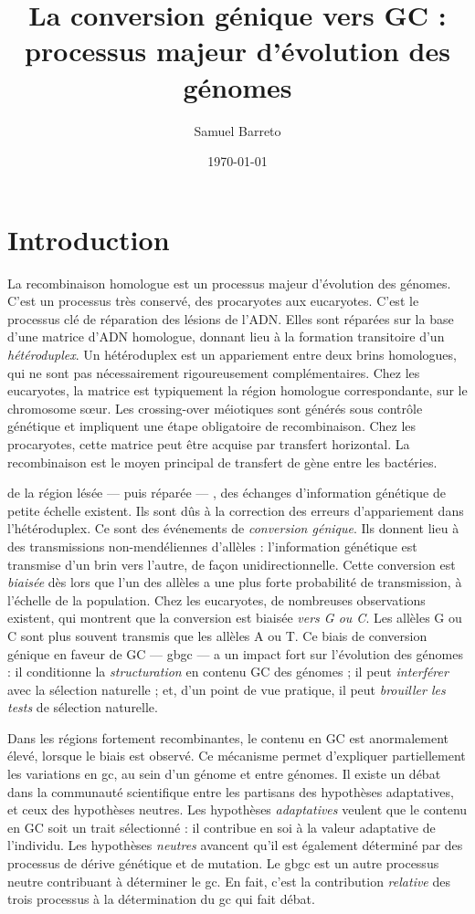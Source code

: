 \documentclass[11pt, oneside]{scrartcl}
\author{Samuel Barreto}
\date{\today}
\title{La conversion génique vers GC : processus majeur d'évolution des génomes}
\begin{document}


\section*{Introduction}
\label{sec:orgheadline1}
La recombinaison homologue est un processus majeur d'évolution des génomes.
C'est un processus très conservé, des procaryotes aux eucaryotes\cite{cromie_recombination_2001}. C'est le
processus clé de réparation des lésions de l'ADN. Elles sont réparées sur la
base d'une matrice d'ADN homologue, donnant lieu à la formation transitoire d'un
\emph{hétéroduplex}. Un hétéroduplex est un appariement entre deux brins homologues,
qui ne sont pas nécessairement rigoureusement complémentaires. Chez les
eucaryotes, la matrice est typiquement la région homologue correspondante, sur
le chromosome sœur. Les crossing-over méiotiques sont générés sous contrôle
génétique et impliquent une étape obligatoire de recombinaison\cite{mancera_high-resolution_2008}. Chez les
procaryotes, cette matrice peut être acquise par transfert horizontal. La
recombinaison est le moyen principal de transfert de gène entre les bactéries\cite{vos_rates_2015}.

 de la région lésée --- puis réparée --- , des échanges
d'information génétique de petite échelle existent\cite{duret_biased_2009}. Ils
sont dûs à la correction des erreurs d'appariement dans l'hétéroduplex. Ce sont
des événements de \emph{conversion génique}. Ils donnent lieu à des transmissions
non-mendéliennes d'allèles : l'information génétique est transmise d'un brin
vers l'autre, de façon unidirectionnelle. Cette conversion est \emph{biaisée} dès
lors que l'un des allèles a une plus forte probabilité de transmission, à
l'échelle de la population. Chez les eucaryotes, de nombreuses observations
existent, qui montrent que la conversion est biaisée \emph{vers G ou
C}\cite{pessia_evidence_2012, mancera_high-resolution_2008}. Les allèles G ou C
sont plus souvent transmis que les allèles A ou T. Ce biais de conversion
génique en faveur de GC --- \ac{gbgc} --- a un impact fort sur l'évolution des
génomes : il conditionne la \emph{structuration} en contenu GC des génomes ; il peut
\emph{interférer} avec la sélection naturelle ; et, d'un point de vue pratique, il
peut \emph{brouiller les tests} de sélection naturelle\cite{duret_biased_2009}.

Dans les régions fortement recombinantes, le contenu en GC est anormalement
élevé, lorsque le biais est observé\cite{duret_impact_2008}. Ce mécanisme permet
d'expliquer partiellement les variations en \ac{gc}, au sein d'un génome et
entre génomes. Il existe un débat dans la communauté scientifique entre les
partisans des hypothèses adaptatives, et ceux des hypothèses neutres. Les
hypothèses \emph{adaptatives} veulent que le contenu en GC soit un trait
sélectionné : il contribue en soi à la valeur adaptative de
l'individu\cite{hildebrand_evidence_2010}. Les hypothèses \emph{neutres} avancent
qu'il est également déterminé par des processus de dérive génétique et de
mutation. Le \ac{gbgc} est un autre processus neutre contribuant à déterminer le
\ac{gc}. En fait, c'est la contribution \emph{relative} des trois processus à la
détermination du \ac{gc} qui fait débat.
\end{document}
